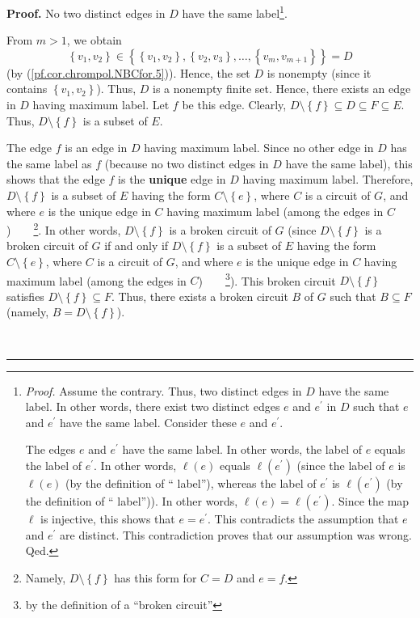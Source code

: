 \documentclass[numbers=enddot,12pt,final,onecolumn,notitlepage]{scrartcl}%
\theoremstyle{definition}
\newenvironment{proof}[1][Proof]{\noindent\textbf{#1.} }{\ \rule{0.5em}{0.5em}}
\newenvironment{verlong}{}{}
\begin{document}
\begin{verlong}
\begin{proof}
No two distinct edges in $D$ have the same label\footnote{\textit{Proof.}
Assume the contrary. Thus, two distinct edges in $D$ have the same label. In
other words, there exist two distinct edges $e$ and $e^{\prime}$ in $D$ such
that $e$ and $e^{\prime}$ have the same label. Consider these $e$ and
$e^{\prime}$.
\par
The edges $e$ and $e^{\prime}$ have the same label. In other words, the label
of $e$ equals the label of $e^{\prime}$. In other words, $\ell\left(
e\right)  $ equals $\ell\left(  e^{\prime}\right)  $ (since the label of $e$
is $\ell\left(  e\right)  $ (by the definition of \textquotedblleft
label\textquotedblright), whereas the label of $e^{\prime}$ is $\ell\left(
e^{\prime}\right)  $ (by the definition of \textquotedblleft
label\textquotedblright)). In other words, $\ell\left(  e\right)  =\ell\left(
e^{\prime}\right)  $. Since the map $\ell$ is injective, this shows that
$e=e^{\prime}$. This contradicts the assumption that $e$ and $e^{\prime}$ are
distinct. This contradiction proves that our assumption was wrong. Qed.}.

From $m>1$, we obtain%
\[
\left\{  v_{1},v_{2}\right\}  \in\left\{  \left\{  v_{1},v_{2}\right\}
,\left\{  v_{2},v_{3}\right\}  ,\ldots,\left\{  v_{m},v_{m+1}\right\}
\right\}  =D
\]
(by (\ref{pf.cor.chrompol.NBCfor.5})). Hence, the set $D$ is nonempty (since
it contains $\left\{  v_{1},v_{2}\right\}  $). Thus, $D$ is a nonempty finite
set. Hence, there exists an edge in $D$ having maximum label. Let $f$ be this
edge. Clearly, $D\setminus\left\{  f\right\}  \subseteq D\subseteq F\subseteq
E$. Thus, $D\setminus\left\{  f\right\}  $ is a subset of $E$.

The edge $f$ is an edge in $D$ having maximum label. Since no other edge in
$D$ has the same label as $f$ (because no two distinct edges in $D$ have the
same label), this shows that the edge $f$ is the \textbf{unique} edge in $D$
having maximum label. Therefore, $D\setminus\left\{  f\right\}  $ is a subset
of $E$ having the form $C\setminus\left\{  e\right\}  $, where $C$ is a
circuit of $G$, and where $e$ is the unique edge in $C$ having maximum label
(among the edges in $C$)\ \ \ \ \footnote{Namely, $D\setminus\left\{
f\right\}  $ has this form for $C=D$ and $e=f$.}. In other words,
$D\setminus\left\{  f\right\}  $ is a broken circuit of $G$ (since
$D\setminus\left\{  f\right\}  $ is a broken circuit of $G$ if and only if
$D\setminus\left\{  f\right\}  $ is a subset of $E$ having the form
$C\setminus\left\{  e\right\}  $, where $C$ is a circuit of $G$, and where $e$
is the unique edge in $C$ having maximum label (among the edges in
$C$)\ \ \ \ \footnote{by the definition of a \textquotedblleft broken
circuit\textquotedblright}). This broken circuit $D\setminus\left\{
f\right\}  $ satisfies $D\setminus\left\{  f\right\}  \subseteq F$. Thus,
there exists a broken circuit $B$ of $G$ such that $B\subseteq F$ (namely,
$B=D\setminus\left\{  f\right\}  $).


\end{proof}
\end{verlong}
\end{document}
